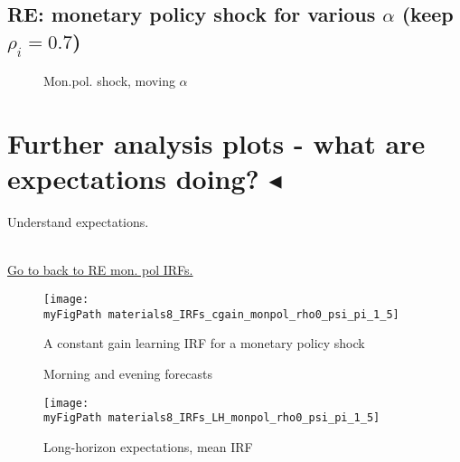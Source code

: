 \documentclass[11pt]{article}
\def \myFigPath {../figures/}
\renewcommand{\[}{\begin{equation}}
\renewcommand{\]}{\end{equation}}
\def\mySmallFigScale{0.22}
\def\mySmallerFigScale{0.18}
\begin{document}
\newpage
\subsection{RE: monetary policy shock for various $\alpha$ (keep $\rho_i = 0.7$)}
\begin{figure}[h!]
\caption{Mon.pol. shock, moving $\alpha$}
\end{figure}

\newpage
\section{Further analysis plots - what are expectations doing? $\blacktriangleleft$}	

\hypertarget{analysis_plots}{Understand expectations.} \\
\hyperlink{RE_monpol}{Go to back to RE mon. pol IRFs.}

\begin{figure}[h!]
\texttt{[image: \\myFigPath materials8\_IRFs\_cgain\_monpol\_rho0\_psi\_pi\_1\_5]}
\caption{A constant gain learning IRF for a monetary policy shock}
\label{gain_irf}
\end{figure}

\begin{figure}[h!]
\caption{Morning and evening forecasts}
\end{figure}

\begin{figure}[h!]
\texttt{[image: \\myFigPath materials8\_IRFs\_LH\_monpol\_rho0\_psi\_pi\_1\_5]}
\caption{Long-horizon expectations, mean IRF}
\end{figure}

\newpage
\end{document}
